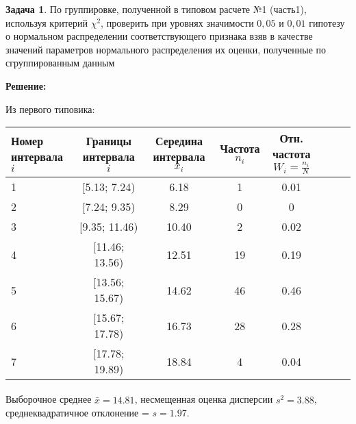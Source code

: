 \documentclass[a4paper,11pt]{article}
\newenvironment{shdd}{\begin{mdframed}[backgroundcolor=shadecolor]}{\end{mdframed}}
\theoremstyle{definition}
\newtheorem{problem}{Задача}\setlength{\parindent}{0pt}
\newenvironment{solution}
{\begin{shdd}
     \textbf{Решение:}\par\setlength{\parindent}{0pt}}
     {
\end{shdd}}
\begin{document}
    \vspace{10pt}
    \begin{problem}
        По группировке, полученной в типовом расчете №1 (часть1), используя критерий \(\chi^2\),
        проверить при уровнях значимости \(0,05\) и \(0,01\) гипотезу о нормальном распределении
        соответствующего признака взяв в качестве значений параметров нормального распределения
        их оценки, полученные по сгруппированным данным

        \begin{solution}
            Из первого типовика:
            \begin{table}[H]
                \centering
                \begin{adjustbox}{max width=\textwidth}
                    \begin{tabular}{l c c c c c c c}
                        \toprule
                        \makecell{Номер \\интервала \( i \)} &
                        \makecell{Границы \\ интервала \( i \)} &
                        \makecell{Середина \\интервала \( x_i \)} &
                        \makecell{Частота \\\( n_i \)} &
                        \makecell{Отн. частота \\\( W_i = \frac{n_i}{N} \)} \\
                        \midrule
                        1 & [5.13; 7.24)   & 6.18  & 1  & 0.01    \\
                        2 & [7.24; 9.35)  & 8.29 & 0  & 0 \\
                        3 & [9.35; 11.46) & 10.40 & 2 & 0.02 \\
                        4 & [11.46; 13.56) & 12.51 & 19 & 0.19 \\
                        5 & [13.56; 15.67) & 14.62 & 46 & 0.46 \\
                        6 & [15.67; 17.78) & 16.73 & 28  & 0.28 \\
                        7 & [17.78; 19.89) & 18.84 & 4  & 0.04 \\
                        \bottomrule
                    \end{tabular}
                \end{adjustbox}\label{tab:table2}
            \end{table}

            Выборочное среднее \(\bar{x} = 14.81\), несмещенная оценка дисперсии \(\hat{s^2} = 3.88 \),
            среднеквадратичное отклонение = \( s = 1.97 \).
            \\
            

\end{solution}
\end{problem}
\end{document}
